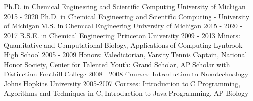 \begin{cventries}
  \ifcompact
  \cventry
    {Ph.D. in Chemical Engineering and Scientific Computing} %
    {University of Michigan} %
    {} %
    {2015 - 2020} %
    {
    }
  \else
  \cventry
    {Ph.D. in Chemical Engineering and Scientific Computing - University of Michigan \linebreak M.S. in Chemical Engineering} %
    {University of Michigan} %
    {} %
    {2015 - 2020  - 2017} %
    {
    }
  \fi
  \cventry
    {B.S.E. in Chemical Engineering} %
    {Princeton University} %
    {} %
    {2009 - 2013} %
    {\quad \scriptsize Minors: Quantitative and Computational Biology, Applications of Computing
    }
\ifoutdated
  \cventry
    {} %
    {Lynbrook High School} %
    {} %
    {2005 - 2009} %
    {\scriptsize Honors: Valedictorian, Varsity Tennis Captain, National Honor Society, Center for Talented Youth: Grand Scholar, AP Scholar with Distinction
    }
  \cventry
    {} %
    {Foothill College} %
    {} %
    {2008 - 2008} %
    {\scriptsize Courses: Introduction to Nanotechnology
    }
  \cventry
    {} %
    {Johns Hopkins University} %
    {} %
    {2005-2007} %
    {\scriptsize Courses: Introduction to C Programming, Algorithms and Techniques in C, Introduction to Java Programming, AP Biology
    }
\fi
\end{cventries}
